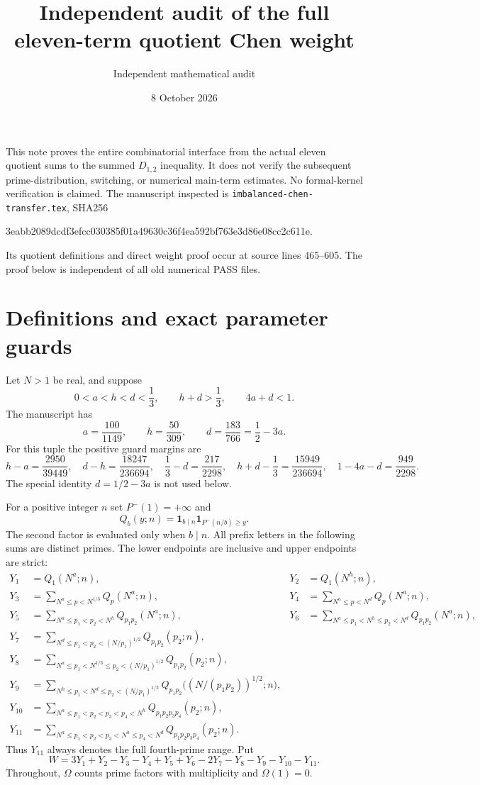 \documentclass[11pt]{article}
\title{Independent audit of the full eleven-term quotient Chen weight}
\author{Independent mathematical audit}
\date{8 October 2026}
\newcommand{\ind}{\mathbf 1}
\newcommand{\Om}{\Omega}
\begin{document}
\maketitle

This note proves the entire combinatorial interface from the actual
eleven quotient sums to the summed $D_{1,2}$ inequality. It does not
verify the subsequent prime-distribution, switching, or numerical
main-term estimates. No formal-kernel verification is claimed.
The manuscript inspected is \texttt{imbalanced-chen-transfer.tex},
SHA256
\begin{center}\small\ttfamily
3eabb2089dcdf3efcc030385f01a49630c36f4ea592bf763e3d86e08cc2c611e.
\end{center}
Its quotient definitions and direct weight proof occur at source lines
465--605. The proof below is independent of all old numerical PASS files.

\section{Definitions and exact parameter guards}
Let $N>1$ be real, and suppose
\begin{equation}\label{eq:guards}
 0<a<h<d<\frac13,\qquad h+d>\frac13,\qquad 4a+d<1.
\end{equation}
The manuscript has
\[
 a=\frac{100}{1149},\qquad h=\frac{50}{309},\qquad
 d=\frac{183}{766}=\frac12-3a.
\]
For this tuple the positive guard margins are
\[
 h-a=\frac{2950}{39449},\quad
 d-h=\frac{18247}{236694},\quad
 \frac13-d=\frac{217}{2298},\quad
 h+d-\frac13=\frac{15949}{236694},\quad
 1-4a-d=\frac{949}{2298}.
\]
The special identity $d=1/2-3a$ is not used below.

For a positive integer $n$ set $P^-(1)=+\infty$ and
\[
 Q_b(y;n)=\ind_{b\mid n}\ind_{P^-(n/b)\ge y}.
\]
The second factor is evaluated only when $b\mid n$.
All prefix letters in the following sums are distinct primes.
The lower endpoints are inclusive and upper endpoints are strict:
\begin{align*}
Y_1&=Q_1(N^a;n),&Y_2&=Q_1(N^h;n),\\
Y_3&=\sum_{N^a\le p<N^{1/3}}Q_p(N^a;n),&
Y_4&=\sum_{N^a\le p<N^d}Q_p(N^a;n),\\
Y_5&=\sum_{N^a\le p_1<p_2<N^h}Q_{p_1p_2}(N^a;n),&
Y_6&=\sum_{N^a\le p_1<N^h\le p_2<N^d}Q_{p_1p_2}(N^a;n),\\
Y_7&=\sum_{N^d\le p_1<p_2<(N/p_1)^{1/2}}Q_{p_1p_2}(p_2;n),\\
Y_8&=\sum_{N^a\le p_1<N^{1/3}\le p_2<(N/p_1)^{1/2}}
 Q_{p_1p_2}(p_2;n),\\
Y_9&=\sum_{N^h\le p_1<N^d\le p_2<(N/p_1)^{1/2}}
 Q_{p_1p_2}\bigl((N/(p_1p_2))^{1/2};n\bigr),\\
Y_{10}&=\sum_{N^a\le p_1<p_2<p_3<p_4<N^h}
 Q_{p_1p_2p_3p_4}(p_2;n),\\
Y_{11}&=\sum_{N^a\le p_1<p_2<p_3<N^h\le p_4<N^d}
 Q_{p_1p_2p_3p_4}(p_2;n).
\end{align*}
Thus $Y_{11}$ always denotes the full fourth-prime range. Put
\begin{equation}\label{eq:weight}
 W=3Y_1+Y_2-Y_3-Y_4+Y_5+Y_6-2Y_7-Y_8-Y_9-Y_{10}-Y_{11}.
\end{equation}
Throughout, $\Om$ counts prime factors with multiplicity and $\Om(1)=0$.
\end{document}
